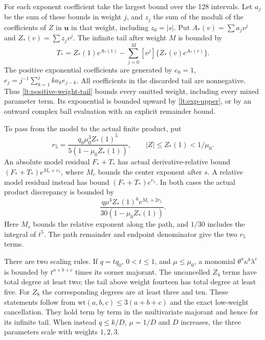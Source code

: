 For each exponent coefficient take the largest bound over the 128
intervals. Let $a_j$ be the sum of these bounds in weight $j$,
and $z_j$ the sum of the moduli of the coefficients of $Z$ in
$\mathbf u$ in that weight, including $z_0=|s|$. Put
$A_* (v)=\sum a_jv^j$ and $Z_*(v)=\sum z_jv^j$. The infinite tail
after weight $M$ is bounded by
\begin{equation}\label{lt:positive-weight-tail}
 T_*=Z_*(1)e^{A_*(1)}-
          \sum_{j=0}^M[v^j]\{Z_*(v)e^{A_*(v)}\}.
\end{equation}
The positive exponential coefficients are generated by
$e_0=1$, $e_j=j^{-1}\sum_{k=1}^jka_ke_{j-k}$.
All coefficients in the discarded tail are nonnegative. Thus
\eqref{lt:positive-weight-tail} bounds every omitted weight, including
every mixed parameter term. Its exponential is bounded upward by
\eqref{lt:exp-upper}, or by an outward complex ball evaluation with
an explicit remainder bound.

To pass from the model to the actual finite product, put
\[
 r_5=\frac{q_0\mu_0^3Z_*(1)^5}{5(1-\mu_0Z_*(1))},
       \qquad |Z|\le Z_*(1)<1/\mu_0.
\]
An absolute model residual $F_*+T_*$ has actual derivative-relative
bound $(F_*+T_*)e^{M_c+r_5}$, where $M_c$ bounds the center exponent
after $s$. A relative model residual instead has bound
$(F_*+T_*)e^{r_5}$. In both cases the actual product discrepancy is
bounded by
\begin{equation}\label{lt:four-actual-tail}
 \frac{q\mu^3Z_*(1)^6e^{M_r+2r_5}}{30(1-\mu_0Z_*(1))}.
\end{equation}
Here $M_r$ bounds the relative exponent along the path, and $1/30$
includes the integral of $t^5$. The path remainder and endpoint
denominator give the two $r_5$ terms.

There are two scaling rules. If $q=tq_0$, $0<t\le1$, and
$\mu\le\mu_0$, a monomial $\theta^a\kappa^b\lambda^c$ is bounded by
$t^{a+b+c}$ times its corner majorant. The uncancelled $Z_4$ terms
have total degree at least two; the tail above weight fourteen has
total degree at least five.
For $Z_8$ the corresponding degrees are at least three and ten.
These statements follow from $\mathrm{wt}(a,b,c)\le3(a+b+c)$
and the exact low-weight cancellation. They hold term by term in the
multivariate majorant and hence for its infinite tail. When instead
$q\le k/D$, $\mu=1/D$ and $D$ increases, the three parameters
scale with weights $1,2,3$.

